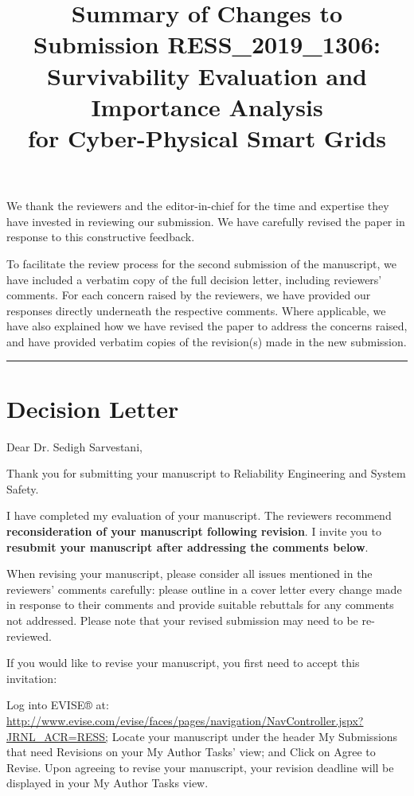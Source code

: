 \documentclass{article}
\title{Summary of Changes to Submission RESS\_2019\_1306: \\
Survivability Evaluation and Importance Analysis \\for Cyber-Physical Smart Grids}
\date{}
\begin{document}
\maketitle
\noindent
We thank the reviewers and the editor-in-chief for the time and expertise they have invested in reviewing our submission. We have carefully revised the paper in response to this constructive feedback.

To facilitate the review process for the second submission of the manuscript, we have included a verbatim copy of the full decision letter, including reviewers' comments. For each concern raised by the reviewers, we have provided our responses directly underneath the respective comments. Where applicable, we have also explained how we have revised the paper to address the concerns raised, and have provided verbatim copies of the revision(s) made in the new submission. \vspace{3em}

\noindent\rule[0.5ex]{\linewidth}{1pt}

\section{Decision Letter}
\label{sec:decision_letter}
Dear Dr. Sedigh Sarvestani,

Thank you for submitting your manuscript to Reliability Engineering and System Safety.

I have completed my evaluation of your manuscript. The reviewers recommend \textbf{reconsideration of your manuscript following revision}. I invite you to \textbf{resubmit your manuscript after addressing the comments below}.

When revising your manuscript, please consider all issues mentioned in the reviewers' comments carefully: please outline in a cover letter every change made in response to their comments and provide suitable rebuttals for any comments not addressed. Please note that your revised submission may need to be re-reviewed.

If you would like to revise your manuscript, you first need to accept this invitation:

Log into EVISE® at: \url{http://www.evise.com/evise/faces/pages/navigation/NavController.jspx?JRNL_ACR=RESS;}
Locate your manuscript under the header My Submissions that need Revisions on your My Author Tasks' view; and
Click on Agree to Revise.
Upon agreeing to revise your manuscript, your revision deadline will be displayed in your My Author Tasks view.
\end{document}
